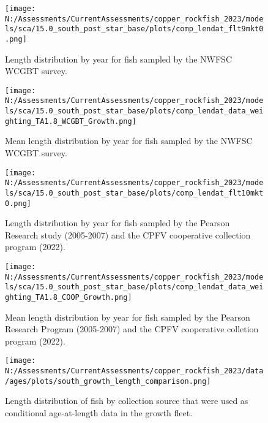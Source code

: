 \documentclass[11pt,
  english,
  letterpaper,
]{article}
\begin{document}
\pagebreak

\pagebreak

\pagebreak

\begin{figure}
\centering
\texttt{[image: N:/Assessments/CurrentAssessments/copper\_rockfish\_2023/models/sca/15.0\_south\_post\_star\_base/plots/comp\_lendat\_flt9mkt0.png]}
\caption{Length distribution by year for fish sampled by the NWFSC WCGBT survey.\label{fig:growth-wcgbt-len}}
\end{figure}

\pagebreak

\begin{figure}
\centering
\texttt{[image: N:/Assessments/CurrentAssessments/copper\_rockfish\_2023/models/sca/15.0\_south\_post\_star\_base/plots/comp\_lendat\_data\_weighting\_TA1.8\_WCGBT\_Growth.png]}
\caption{Mean length distribution by year for fish sampled by the NWFSC WCGBT survey.\label{fig:growth-mean-wcgbt-len}}
\end{figure}

\pagebreak

\begin{figure}
\centering
\texttt{[image: N:/Assessments/CurrentAssessments/copper\_rockfish\_2023/models/sca/15.0\_south\_post\_star\_base/plots/comp\_lendat\_flt10mkt0.png]}
\caption{Length distribution by year for fish sampled by the Pearson Research study (2005-2007) and the CPFV cooperative collection program (2022).\label{fig:growth-coop-len}}
\end{figure}

\pagebreak

\begin{figure}
\centering
\texttt{[image: N:/Assessments/CurrentAssessments/copper\_rockfish\_2023/models/sca/15.0\_south\_post\_star\_base/plots/comp\_lendat\_data\_weighting\_TA1.8\_COOP\_Growth.png]}
\caption{Mean length distribution by year for fish sampled by the Pearson Research Program (2005-2007) and the CPFV cooperative colletion program (2022).\label{fig:growth-mean-coop-len}}
\end{figure}

\pagebreak

\begin{figure}
\centering
\texttt{[image: N:/Assessments/CurrentAssessments/copper\_rockfish\_2023/data/ages/plots/south\_growth\_length\_comparison.png]}
\caption{Length distribution of fish by collection source that were used as conditional age-at-length data in the growth fleet.\label{fig:growth-len-dist}}
\end{figure}
\end{document}

